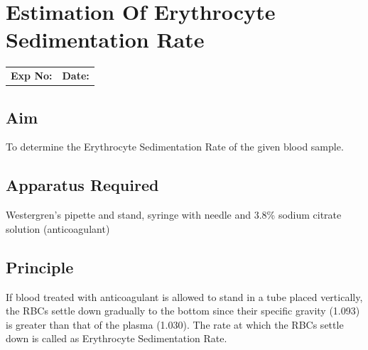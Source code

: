 \documentclass[a4paper,12pt,openany,twoside]{book}
\begin{document}
											\chapter*{\centering Estimation Of Erythrocyte Sedimentation Rate}
											\begin{tabular}{p{5in} p{1in}}
												\textbf{Exp No:}  & \textbf{Date:}\\
											\end{tabular}
											\section*{Aim}
											To determine the Erythrocyte Sedimentation Rate of the given blood sample.
											\section*{Apparatus Required}

												Westergren’s pipette and stand, syringe with needle and 3.8\% sodium citrate solution (anticoagulant)

												\section*{Principle}
												If blood treated with anticoagulant is allowed to stand in a tube placed vertically, the RBCs settle down gradually to the bottom since their specific gravity (1.093) is greater than that of the plasma (1.030).
												The rate  at  which the  RBCs settle down is called as Erythrocyte Sedimentation
												Rate.
\end{document}
